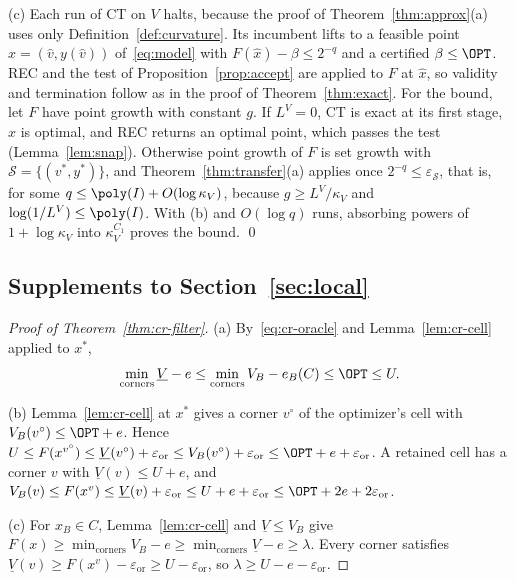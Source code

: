 (c) Each run of CT on $V$ halts, because the proof of
Theorem~\ref{thm:approx}(a) uses only Definition~\ref{def:curvature}. Its
incumbent lifts to a feasible point $\hat x=(\hat v,y(\hat v))$
of~\eqref{eq:model} with $F(\hat x)-\beta\le2^{-q}$ and a certified
$\beta\le\OPT$. REC and the test of Proposition~\ref{prop:accept} are
applied to $F$ at $\hat x$, so validity and termination follow as in the
proof of Theorem~\ref{thm:exact}. For the bound, let $F$ have point growth
with constant $g$. If $L^V=0$, CT is exact at its first stage, $\hat x$ is
optimal, and REC returns an optimal point, which passes the test
(Lemma~\ref{lem:snap}). Otherwise point growth of $F$ is set growth with
$\mathcal S=\{(v^*,y^*)\}$, and Theorem~\ref{thm:transfer}(a) applies once
$2^{-q}\le\varepsilon_{\mathcal S}$, that is, for some
$q\le\poly(I)+O(\log\kappa_V)$, because $g\ge L^V/\kappa_V$ and
$\log(1/L^V)\le\poly(I)$. With (b) and $O(\log q)$ runs, absorbing powers of
$1+\log\kappa_V$ into $\kappa_V^{C_1}$ proves the bound.
\qed

\subsection{Supplements to Section~\ref{sec:local}}

\begin{proof}[Proof of Theorem~\ref{thm:cr-filter}]
(a) By~\eqref{eq:cr-oracle} and Lemma~\ref{lem:cr-cell} applied to $x^*$,
\[
\min_{\text{corners}}\underline V-e\le\min_{\text{corners}}V_B-e_B(C)\le\OPT\le U.
\]

(b) Lemma~\ref{lem:cr-cell} at $x^*$ gives a corner $v^\circ$ of the
optimizer's cell with $V_B(v^\circ)\le\OPT+e$. Hence
$U\le F(x^{v^\circ})\le\underline V(v^\circ)+\varepsilon_{\mathrm{or}}\le V_B(v^\circ)+\varepsilon_{\mathrm{or}}\le\OPT+e+\varepsilon_{\mathrm{or}}$.
A retained cell has a corner $v$ with $\underline V(v)\le U+e$, and
$V_B(v)\le F(x^v)\le\underline V(v)+\varepsilon_{\mathrm{or}}\le U+e+\varepsilon_{\mathrm{or}}\le\OPT+2e+2\varepsilon_{\mathrm{or}}$.

(c) For $x_B\in C$, Lemma~\ref{lem:cr-cell} and $\underline V\le V_B$ give
$F(x)\ge\min_{\text{corners}}V_B-e\ge\min_{\text{corners}}\underline V-e\ge\lambda$.
Every corner satisfies $\underline V(v)\ge F(x^v)-\varepsilon_{\mathrm{or}}\ge U-\varepsilon_{\mathrm{or}}$, so
$\lambda\ge U-e-\varepsilon_{\mathrm{or}}$.
\end{proof}

